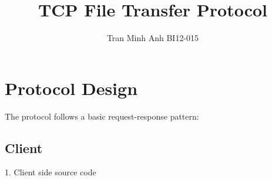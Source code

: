 \documentclass{article}
\begin{document}
\title{TCP File Transfer Protocol}
\author{Tran Minh Anh BI12-015}

\maketitle

\section{Protocol Design}

The protocol follows a basic request-response pattern:

\subsection{Client}

1. Client side source code\newline
\end{document}
